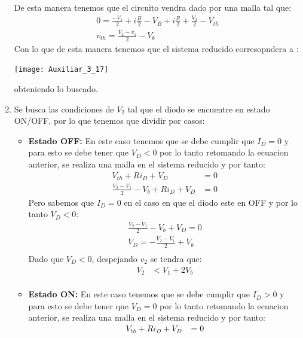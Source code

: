 \documentclass[
  11pt,
  letterpaper,
   addpoints,
   answers
  ]{exam}
\begin{document}
\begin{questions}
\begin{solution}
\begin{enumerate}
\begin{center}
    \end{center}
    De esta manera tenemos que el circuito vendra dado por una malla tal que:
    \begin{align}
        0 = \frac{-V_{1}}{2} + i\frac{R}{2} - V_{B} + i\frac{R}{2} + \frac{V_{2}}{2}-V_{th}\\
        v_{th}= \frac{V_{2}- v_{1}}{2} - V_{b}
    \end{align}
    Con lo que de esta manera tenemos que el sistema reducido corresopndera a :
    \begin{center}
        \texttt{[image: Auxiliar\_3\_17]}
    \end{center}
    obteniendo lo buscado.
    \item Se busca las condiciones de $V_2$ tal que el diodo se encuentre en estado ON/OFF, por lo que tenemos que dividir por casos:
    \begin{itemize}
        \item \textbf{Estado OFF:} En este caso tenemos que se debe cumplir que $I_{D} = 0$ y para esto se debe tener que $V_{D} < 0$ por lo tanto retomando la ecuacion anterior, se realiza una malla en el sistema reducido y por tanto:
        \begin{align}
            V_{th} + Ri_{D} +V_{D}&= 0\\
            \frac{V_{2}- V_{1}}{2} - V_{b} + Ri_{D} +V_{D}&= 0
        \end{align} 
        Pero sabemos que $I_{D}= 0 $ en el caso en que el diodo este en OFF y por lo tanto $V_{D} < 0 $:
        \begin{align}
            \frac{V_{2}- V_{1}}{2} - V_{b} +V_{D}= 0\\
            V_{D} = -\frac{V_{2}- V_{1}}{2} + V_{b}\\
        \end{align} 
        Dado que $V_{D} < 0$, despejando $v_{2}$ se tendra que:
        \begin{align}
            V_{2} &< V_{1} + 2V_{b}\\
        \end{align}
        \item \textbf{Estado ON:} En este caso tenemos que se debe cumplir que $I_{D} > 0$ y para esto se debe tener que $V_{D} = 0$ por lo tanto retomando la ecuacion anterior, se realiza una malla en el sistema reducido y por tanto:
        \begin{align}
            V_{th} + Ri_{D} +V_{D}&= 0\\

\end{align}
\end{itemize}
\end{enumerate}
\end{solution}
\end{questions}
\end{document}
